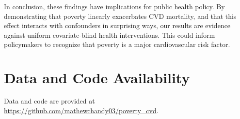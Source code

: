 \documentclass{article}
\theoremstyle{plain}
\theoremstyle{definition}
\theoremstyle{remark}
\begin{document}
In conclusion, these findings have implications for public health policy. 
By demonstrating that poverty linearly exacerbates CVD mortality, 
and that this effect interacts with confounders in surprising ways, our results are evidence against uniform covariate-blind health interventions. This could inform
policymakers to
recognize that poverty is a major cardiovascular risk factor.

\section*{Data and Code Availability}
Data and code are provided at \url{https://github.com/mathewchandy03/poverty_cvd}.






\end{document}
